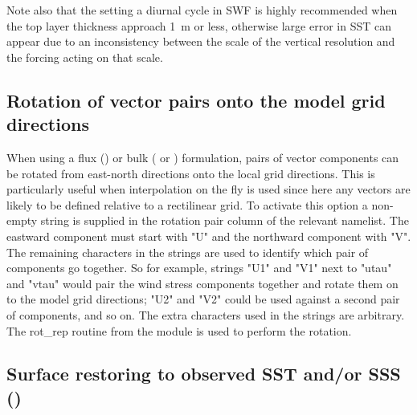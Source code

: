 \documentclass[../tex_main/NEMO_manual]{subfiles}
\begin{document}
Note also that the setting a diurnal cycle in SWF is highly recommended  when 
the top layer thickness approach 1~m or less, otherwise large error in SST can 
appear due to an inconsistency between the scale of the vertical resolution 
and the forcing acting on that scale.

\subsection{Rotation of vector pairs onto the model grid directions}
\label{subsec:SBC_rotation}

When using a flux () or bulk ( or ) formulation, 
pairs of vector components can be rotated from east-north directions onto the local grid directions.  
This is particularly useful when interpolation on the fly is used since here any vectors are likely to be defined 
relative to a rectilinear grid.
To activate this option a non-empty string is supplied in the rotation pair column of the relevant namelist.
The eastward component must start with "U" and the northward component with "V".  
The remaining characters in the strings are used to identify which pair of components go together.
So for example, strings "U1" and "V1" next to "utau" and "vtau" would pair the wind stress components together
and rotate them on to the model grid directions; "U2" and "V2" could be used against a second pair of components, 
and so on.
The extra characters used in the strings are arbitrary.
The rot\_rep routine from the  module is used to perform the rotation.

\subsection{Surface restoring to observed SST and/or SSS (\protect{})}
\label{subsec:SBC_ssr}
\end{document}
